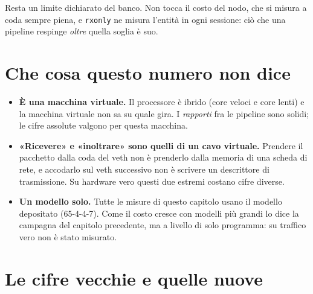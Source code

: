\documentclass[11pt,a4paper,oneside]{report}
\begin{document}
Resta un limite dichiarato del banco. Non tocca il costo del nodo, che si misura a
coda sempre piena, e \texttt{rxonly} ne misura l'entità in ogni sessione: ciò che
una pipeline respinge \emph{oltre} quella soglia è suo.

\section{Che cosa questo numero non dice}

\begin{itemize}
  \item \textbf{È una macchina virtuale.} Il processore è ibrido (core veloci e core
        lenti) e la macchina virtuale non sa su quale gira. I \emph{rapporti} fra le
        pipeline sono solidi; le cifre assolute valgono per questa macchina.
  \item \textbf{«Ricevere» e «inoltrare» sono quelli di un cavo virtuale.} Prendere il
        pacchetto dalla coda del veth non è prenderlo dalla memoria di una scheda di
        rete, e accodarlo sul veth successivo non è scrivere un descrittore di
        trasmissione. Su hardware vero questi due estremi costano cifre diverse.
  \item \textbf{Un modello solo.} Tutte le misure di questo capitolo usano il modello
        depositato (65-4-4-7). Come il costo cresce con modelli più grandi lo dice la
        campagna del capitolo precedente, ma a livello di solo programma: su traffico
        vero non è stato misurato.
\end{itemize}

\section{Le cifre vecchie e quelle nuove}
\end{document}
